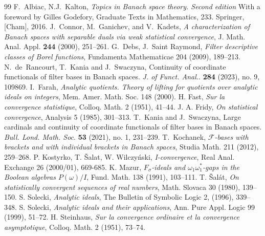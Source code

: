 \documentclass[10pt,a4paper]{amsart}
\begin{document}
\begin{thebibliography}{99}
 F.~Albiac, N.J.~Kalton, \emph{Topics in {B}anach space theory. Second edition} With a foreword by Gilles Godefory, Graduate Texts in Mathematics, 233. Springer, [Cham], 2016.
 J.~Connor, M.~Ganichev, and V.~Kadets, \emph{A characterization of Banach spaces with separable duals via weak statistical convergence}, J. Math. Anal. Appl. \textbf{244} (2000), 251--261.
 G.~Debs, J.~Saint Raymond, \emph{Filter descriptive classes of Borel functions}, Fundamenta Mathematicae 204 (2009), 189--213.
 N.~de~Rancourt, T.~Kania and J.~Swaczyna, Continuity of coordinate functionals of filter bases in Banach spaces. \emph{J. of Funct. Anal.}. \textbf{284} (2023), no. 9, 109869.
 I.~Farah, \emph{Analytic quotients. Theory of lifting for quotients over analytic ideals on integers},
Mem. Amer. Math. Soc. 148 (2000).
 H. Fast, \emph{Sur la convergence statistique}, Colloq. Math. 2 (1951), 41--44.
 J. A. Fridy, \emph{On statistical convergence}, Analysis 5 (1985), 301--313.
 T.~Kania and J.~Swaczyna, Large cardinals and continuity of coordinate functionals of filter bases in Banach spaces. \emph{Bull. Lond. Math. Soc}. \textbf{53} (2021), no. 1, 231--239.
 T.~Kochanek, \emph{$\mathcal F$-bases with brackets and with individual brackets in Banach spaces}, Studia Math. 211 (2012), 259--268.
 P. Kostyrko, T. \v{S}alat, W. Wilczy\'nski, \emph{I-convergence}, Real Anal. Exchange 26 (2000/01), 669-685.
 K. Mazur, \emph{{$F_\sigma$}-ideals and {$\omega_1\omega_1^*$}-gaps in the {B}oolean algebras {$P(\omega)/I$}}, Fund. Math. 138 (1991), 103--111.
 T. \v{S}al\'{a}t,
\emph{On statistically convergent sequences of real numbers},
Math. Slovaca 30 (1980), 139--150.
 S. Solecki, \emph{Analytic ideals}, The Bulletin of Symbolic Logic 2, (1996), 339--348.
 S. Solecki, \emph{Analytic ideals and their applications}, Ann. Pure Appl. Logic 99 (1999), 51--72.
 H. Steinhaus,
\emph{Sur la convergence ordinaire et la convergence asymptotique},
Colloq. Math. 2 (1951), 73--74.
\end{thebibliography}
\end{document}
